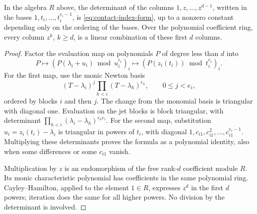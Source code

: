 \begin{lemma}
\label{lem:confluent-power-basis}
In the algebra $R$ above, the determinant of the columns
$1,z,\ldots,z^{d-1}$, written in the bases
$1,t_i,\ldots,t_i^{e_i-1}$, is
\eqref{eq:contact-index-form}, up to a nonzero constant depending
only on the ordering of the bases. Over the polynomial coefficient
ring, every column $z^k$, $k\ge d$, is a linear combination of
these first $d$ columns.
\end{lemma}
\begin{proof}
Factor the evaluation map on polynomials $P$ of degree less than
$d$ into
\[
 P\longmapsto
    (P(\lambda_i+u_i)\bmod u_i^{e_i})_i
 \longmapsto
    (P(z_i(t_i))\bmod t_i^{e_i})_i.
\]
For the first map, use the monic Newton basis
\[
 (T-\lambda_i)^j\prod_{h<i}(T-\lambda_h)^{e_h},
       \qquad 0\le j<e_i,
\]
ordered by blocks $i$ and then $j$. The change from the monomial
basis is triangular with diagonal one. Evaluation on the jet
blocks is block triangular, with determinant
$\prod_{h<i}(\lambda_i-\lambda_h)^{e_h e_i}$.
For the second map, substitution $u_i=z_i(t_i)-\lambda_i$ is
triangular in powers of $t_i$, with diagonal
$1,c_{i1},c_{i1}^2,\ldots,c_{i1}^{e_i-1}$.
Multiplying these determinants proves the formula as a polynomial
identity, also when some differences or some $c_{i1}$ vanish.

Multiplication by $z$ is an endomorphism of the free rank-$d$
coefficient module $R$. Its monic characteristic polynomial has
coefficients in the same polynomial ring. Cayley--Hamilton, applied
to the element $1\in R$, expresses $z^d$ in the first $d$ powers;
iteration does the same for all higher powers. No division by the
determinant is involved.
\end{proof}

